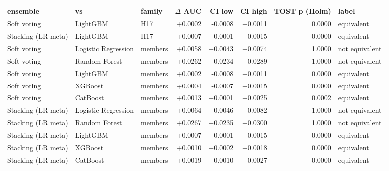 \begin{tabular}{lllrrrrl}
\toprule
ensemble & vs & family & $\Delta$ AUC & CI low & CI high & TOST p (Holm) & label \\
\midrule
Soft voting & LightGBM & H17 & +0.0002 & -0.0008 & +0.0011 & 0.0000 & equivalent \\
Stacking (LR meta) & LightGBM & H17 & +0.0007 & -0.0001 & +0.0015 & 0.0000 & equivalent \\
Soft voting & Logistic Regression & members & +0.0058 & +0.0043 & +0.0074 & 1.0000 & not equivalent \\
Soft voting & Random Forest & members & +0.0262 & +0.0234 & +0.0289 & 1.0000 & not equivalent \\
Soft voting & LightGBM & members & +0.0002 & -0.0008 & +0.0011 & 0.0000 & equivalent \\
Soft voting & XGBoost & members & +0.0004 & -0.0007 & +0.0015 & 0.0000 & equivalent \\
Soft voting & CatBoost & members & +0.0013 & +0.0001 & +0.0025 & 0.0002 & equivalent \\
Stacking (LR meta) & Logistic Regression & members & +0.0064 & +0.0046 & +0.0082 & 1.0000 & not equivalent \\
Stacking (LR meta) & Random Forest & members & +0.0267 & +0.0235 & +0.0300 & 1.0000 & not equivalent \\
Stacking (LR meta) & LightGBM & members & +0.0007 & -0.0001 & +0.0015 & 0.0000 & equivalent \\
Stacking (LR meta) & XGBoost & members & +0.0010 & +0.0002 & +0.0018 & 0.0000 & equivalent \\
Stacking (LR meta) & CatBoost & members & +0.0019 & +0.0010 & +0.0027 & 0.0000 & equivalent \\
\bottomrule
\end{tabular}
